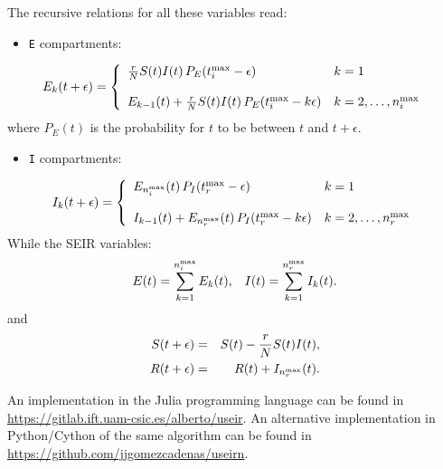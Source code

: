\documentclass[a4paper,oneside,11pt]{article}
\begin{document}
The recursive relations for all these variables read:
\begin{itemize}
\item \texttt{E} compartments:
\end{itemize}
\begin{equation}
E_k(t+\epsilon) = \left \{
\begin{array}{ll}
{r\over N}S(t)I(t)\, P_E(t_i^{\rm max}-\epsilon) & k=1 \\
& \\
E_{k-1}(t) + {r\over N}S(t)I(t)\, P_E(t_i^{\rm max}-k\epsilon) & k=2,\dots,n_i^{\rm max}\\
\end{array}
\right.
\end{equation}
where \(P_E(t)\) is the probability for \(t\) to be between \(t\) and
\(t+\epsilon\). 
\begin{itemize}
\item \texttt{I} compartments:
\end{itemize}
\begin{equation}
I_k(t+\epsilon) = \left \{
\begin{array}{ll}
E_{n_i^{\rm max}}(t)\, P_I(t_r^{\rm max}-\epsilon) & k=1 \\
& \\
I_{k-1}(t) + E_{n_r^{\rm max}}(t)\, P_I(t_r^{\rm max}-k\epsilon) & k=2,\dots,n_r^{\rm max}\\
\end{array}
\right.
\end{equation}
While the SEIR variables:
  \begin{eqnarray}
  E(t) = \sum_{k=1}^{n_i^{\rm max}} E_k(t), \;\;\;
  I(t) = \sum_{k=1}^{n_r^{\rm max}} I_k(t). 
  \end{eqnarray}
  and 
  \begin{eqnarray}
  S(t+\epsilon) &=& S(t) - {r\over N} S(t) I(t),\nonumber\\
  R(t+\epsilon) &=& R(t) + I_{n_{r}^{\rm max}}(t). 
  \end{eqnarray}

An implementation in the Julia programming language can be found in \url{https://gitlab.ift.uam-csic.es/alberto/useir}. An alternative implementation in Python/Cython of the same algorithm can be found in \url{https://github.com/jjgomezcadenas/useirn}. 



















\end{document}
